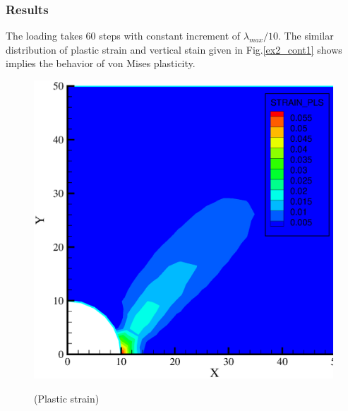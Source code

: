 \subsubsection*{Results}

The loading takes 60 steps with constant increment of
$\lambda_{max}/10$.  The similar distribution of plastic strain and
vertical stain given in Fig.\ref{ex2_cont1} shows implies the
behavior of von Mises plasticity.

\begin{figure}[!thb]
  \begin{center}
   \begin{minipage}[t]{0.48\textwidth}
     \begin{center}
    \includegraphics[scale=0.28]{M/ex1_pls_4.1.eps}
    \centerline{(Plastic strain)}
    \end{center}
   \end{minipage}
   \hspace{0.02\textwidth}
   \begin{minipage}[t]{0.48\textwidth}
    \begin{center}

\end{center}
\end{minipage}
\end{center}
\end{figure}
